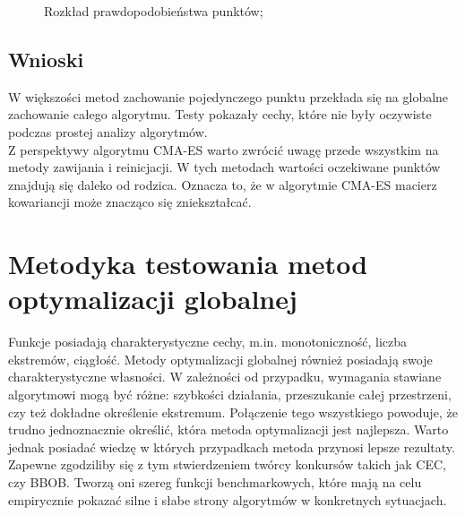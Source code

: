 \documentclass{mini}
\begin{document}
\begin{figure}[H]
\centering
{}
\quad
{}
\caption{Rozkład prawdopodobieństwa punktów;}
\end{figure}

\subsection{Wnioski}
W większości metod zachowanie pojedynczego punktu przekłada się na globalne zachowanie całego algorytmu. Testy pokazały cechy, które nie były oczywiste podczas prostej analizy algorytmów.\\
Z perspektywy algorytmu CMA-ES warto zwrócić uwagę przede wszystkim na metody zawijania i reinicjacji. W tych metodach wartości oczekiwane punktów znajdują się daleko od rodzica. Oznacza to, że w algorytmie CMA-ES macierz kowariancji może znacząco się zniekształcać.

\pagebreak

\section{Metodyka testowania metod optymalizacji globalnej}
Funkcje posiadają charakterystyczne cechy, m.in. monotoniczność, liczba ekstremów, ciągłość. Metody optymalizacji globalnej również posiadają swoje charakterystyczne własności. W zależności od przypadku, wymagania stawiane algorytmowi mogą być różne: szybkości działania, przeszukanie całej przestrzeni, czy też dokładne określenie ekstremum. Połączenie tego wszystkiego powoduje, że trudno jednoznacznie określić, która metoda optymalizacji jest najlepsza. Warto jednak posiadać wiedzę w których przypadkach metoda przynosi lepsze rezultaty.\\
Zapewne zgodziliby się z tym stwierdzeniem twórcy konkursów takich jak CEC, czy BBOB. Tworzą oni szereg funkcji benchmarkowych, które mają na celu empirycznie pokazać silne i słabe strony algorytmów w konkretnych sytuacjach.
\end{document}
